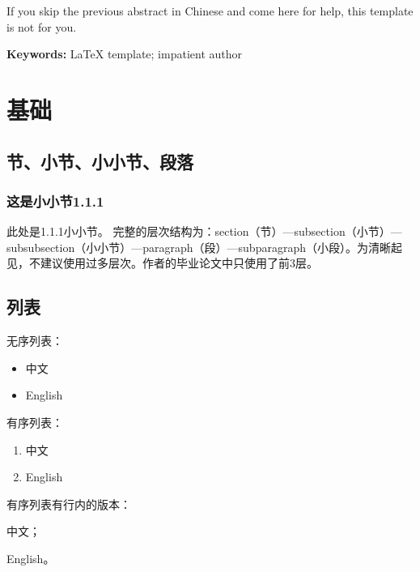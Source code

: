 \documentclass[zihao = -4, linespread = 1.5]{ctexart}
\begin{document}
\begin{NKUAbstractEn}
If you skip the previous abstract in Chinese and come here for help, this template is not for you\smiley{}.
\par\noindent\textbf{Keywords: }\LaTeX{} template; impatient author
\end{NKUAbstractEn}



\tableofcontents %
\newpage
{} %



\section{基础}\label{sec:fundamental}
\subsection{节、小节、小小节、段落}
\subsubsection{这是小小节1.1.1}
此处是1.1.1小小节。
完整的层次结构为：section（节）---subsection（小节）---subsubsection（小小节）---paragraph（段）---subparagraph（小段）。为清晰起见，不建议使用过多层次。作者的毕业论文中只使用了前3层。
\subsection{列表}
无序列表：
\begin{itemize}
  \item 中文
  \item English
\end{itemize}

有序列表：
\begin{enumerate}
  \item 中文
  \item English
\end{enumerate}

有序列表有行内的版本：\begin{enumerate*}[label=(\arabic*)]
\item 中文；
\item English。
\end{enumerate*}
\end{document}
